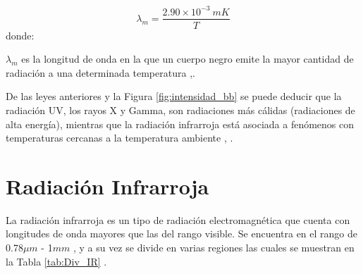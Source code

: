     \begin{equation}
        \lambda_{m} = \frac{2.90\times10^{-3}\ mK}{T}
        \label{eq:Wien}
    \end{equation}   
    donde:
    
    $\lambda_{m}$ es la longitud de onda en la que un cuerpo negro emite la mayor cantidad de radiación a una determinada temperatura \cite{Sears},\cite{FUV3}.
    
    De las leyes anteriores y la Figura \ref{fig:intensidad_bb} se puede deducir que la radiación UV, los rayos X y Gamma, son radiaciones más cálidas (radiaciones de alta energía), mientras que la radiación infrarroja está asociada a fenómenos con temperaturas cercanas a la temperatura ambiente \cite{Chang}, \cite{BlancoMDA}.     
    
    \section{Radiación Infrarroja} 
    La radiación infrarroja es un tipo de radiación electromagnética que cuenta con longitudes de onda mayores que las del rango visible. Se encuentra en el rango de 0.78$\mu m$ - 1$mm$ \cite{BlancoMDA}, y a su vez se divide en varias regiones las cuales se muestran en la Tabla \ref{tab:Div_IR} \cite{Rogalski}.
    
            \begin{table}[htbp]
                \caption{División de la radiación infrarroja.}
                \begin{center}
                \label{tab:Div_IR}
                \end{center}
            \end{table}
            
